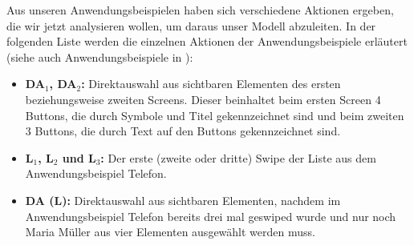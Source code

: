 Aus unseren Anwendungsbeispielen haben sich verschiedene Aktionen ergeben, die wir jetzt analysieren wollen, um daraus unser Modell abzuleiten. 
In der folgenden Liste werden die einzelnen Aktionen der Anwendungsbeispiele erläutert (siehe auch Anwendungsbeispiele in ):
\begin{itemize}
	\item \textbf{DA$_1$, DA$_2$:} Direktauswahl aus sichtbaren Elementen des ersten beziehungsweise zweiten Screens. 
	Dieser beinhaltet beim ersten Screen 4 Buttons, die durch Symbole und Titel gekennzeichnet sind und beim zweiten 3 Buttons, die durch Text auf den Buttons gekennzeichnet sind.
	\item \textbf{L$_1$, L$_2$ und L$_3$:} Der erste (zweite oder dritte) Swipe der Liste aus dem Anwendungsbeispiel Telefon. 
	\item \textbf{DA (L):} Direktauswahl aus sichtbaren Elementen, nachdem im Anwendungsbeispiel Telefon bereits drei mal geswiped wurde und nur noch Maria Müller aus vier Elementen ausgewählt werden muss.	


\end{itemize}
